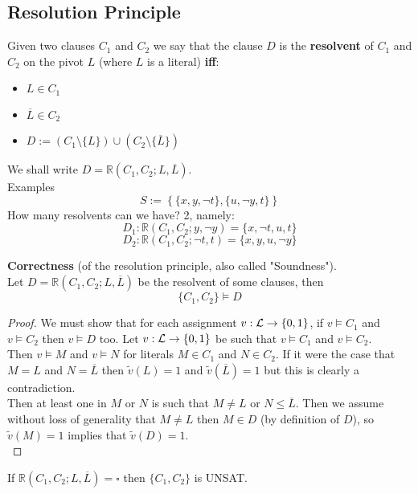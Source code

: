 \newpage

\subsection{Resolution Principle}
Given two clauses $C_1$ and $C_2$ we say that the clause $D$ is the \textbf{resolvent} of $C_1$ and $C_2$ on the pivot $L$ (where $L$ is a literal) \textbf{iff}:
\begin{itemize}
	\item $L \in C_1$
	\item $\overline L \in C_2$
	\item $D:= (C_1 \setminus \{L\}) \cup (C_2 \setminus \{\overline L\})$
\end{itemize}

We shall write $D = \mathbb{R} (C_1, C_2; L, \overline L)$.\\

Examples
$$ S := \left\{\{x,y,\neg t\}, \{u, \neg y, t\}\right\} $$
How many resolvents can we have? 2, namely: 
$$ D_1: \mathbb{R} (C_1, C_2; y, \neg y) = \{x, \neg t, u, t\} $$
$$ D_2: \mathbb{R} (C_1, C_2; \neg t, t) = \{x,y,u, \neg y\} $$

\begin{lemma}
	\textbf{Correctness} (of the resolution principle, also called "Soundness"). \\
	Let $D = \mathbb{R}(C_1, C_2; L, \overline L)$ be the resolvent of some clauses, then 
	$$\{C_1, C_2\} \models D$$
\end{lemma}

\begin{proof}
	We must show that for each assignment $v: \mathcal{L} \rightarrow \{0,1\}$, if $v \models C_1$ and $v \models C_2$ then $v \models D$ too. Let $v: \mathcal{L} \rightarrow \{0,1\}$ be such that $v \models C_1$ and $v \models C_2$.\\
	
	Then $v \models M$ and $v \models N$ for literals $M \in C_1$ and $N \in C_2$. If it were the case that $M=L$ and $N = \overline L$ then $\tilde v (L) = 1$ and $\tilde v(\overline L) = 1$ but this is clearly a contradiction.\\
	
	Then at least one in $M$ or $N$ is such that $M \neq L$ or $N \leq \overline L$. Then we assume without loss of generality that $M \neq L$ then $M \in D$ (by definition of $D$), so $\tilde v (M) = 1$ implies that $\tilde v (D) = 1$.\\
\end{proof}

\begin{corollary}
	If $\mathbb{R} (C_1, C_2; L, \overline L) = \square$ then $\{C_1, C_2\}$ is UNSAT.\\
\end{corollary}

